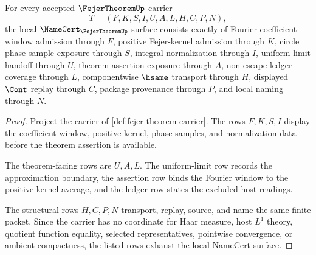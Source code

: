 \begin{theorem}
\label{thm:fejer-theorem-namecert-obligations}
For every accepted $\FejerTheoremUp$ carrier
$$
T=(F,K,S,I,U,A,L,H,C,P,N),
$$
the local $\NameCert_{\FejerTheoremUp}$ surface consists exactly of Fourier coefficient-window admission through $F$, positive Fejer-kernel admission through $K$, circle phase-sample exposure through $S$, integral normalization through $I$, uniform-limit handoff through $U$, theorem assertion exposure through $A$, non-escape ledger coverage through $L$, componentwise $\hsame$ transport through $H$, displayed $\Cont$ replay through $C$, package provenance through $P$, and local naming through $N$.
\end{theorem}
\begin{proof}
Project the carrier of \autoref{def:fejer-theorem-carrier}. The rows $F,K,S,I$ display the coefficient window, positive kernel, phase samples, and normalization data before the theorem assertion is available.

The theorem-facing rows are $U,A,L$. The uniform-limit row records the approximation boundary, the assertion row binds the Fourier window to the positive-kernel average, and the ledger row states the excluded host readings.

The structural rows $H,C,P,N$ transport, replay, source, and name the same finite packet. Since the carrier has no coordinate for Haar measure, host $L^{1}$ theory, quotient function equality, selected representatives, pointwise convergence, or ambient compactness, the listed rows exhaust the local NameCert surface.
\end{proof}

